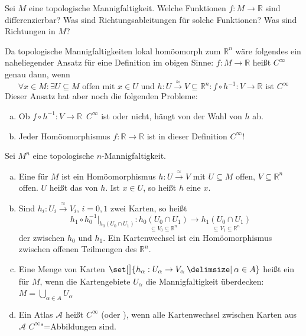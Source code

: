 Sei $M$ eine topologische Mannigfaltigkeit. 
Welche Funktionen $f \colon M \to \mathbb{R}$ sind differenzierbar? 
Was sind Richtungsableitungen für solche Funktionen? 
Was sind Richtungen in $M$?

Da topologische Mannigfaltigkeiten lokal homöomorph zum $\mathbb{R}^n $ wäre folgendes ein naheliegender Ansatz für eine Definition im obigen Sinne:
$f \colon M \to \mathbb{R}$ heißt $C^\infty$ genau dann, wenn
\[
	\forall x \in M : \exists  U \subseteq M \text{ offen mit } x \in U \text { und } h \colon U \xrightarrow{\approx}  V \subseteq \mathbb{R}^n : f \circ h ^{-1} : V \to \mathbb{R} \text{ ist } C^\infty
\]
Dieser Ansatz hat aber noch die folgenden Probleme:
\begin{enumerate}[a)]
	\item Ob $f \circ h ^{-1} \colon V \to \mathbb{R}$ $\, C^\infty$ ist oder nicht, hängt von der Wahl von $h$ ab.
	\item Jeder Homöomorphismus $f \colon \mathbb{R} \to \mathbb{R}$ ist in dieser Definition $C^\infty$!
\end{enumerate}

\begin{definition}[{name=[{Karten, Kartenwechsel, Atlanten}]}]
	Sei $M^n$ eine topologische $n$-Mannigfaltigkeit. 
	\begin{enumerate}[a)]
		\item Eine  für $M$ ist ein Homöomorphismus $h \colon U \xrightarrow{\approx}V$ mit $U \subseteq M$ offen, $V\subseteq\mathbb{R}^n$ offen. 
		$U$ heißt das  von $h$. 
		Ist $x \in U$, so heißt $h$ eine  $x$.
		\item Sind $h_i \colon U_i \xrightarrow{\approx} V_i$, $i=0,1$ zwei Karten, so heißt 
		\[
			h_1 \circ h_0 ^{-1}\big|_{h_0(U_0 \cap U_1)} \colon \underset{\subseteq V_0 \subseteq \mathbb{R}^n}{h_0(U_0 \cap U_1)} \to \underset{\subseteq V_1 \subseteq 
			\mathbb{R}^n}{h_1 (U_0 \cap U_1)}
		\]
		der  zwischen $h_0$ und $h_1$. 
		Ein Kartenwechsel ist ein Homöomorphismus zwischen offenen Teilmengen des $\mathbb{R}^n$. 
		\item Eine Menge von Karten $\set[\big]{h_\alpha : U_\alpha \to V_\alpha \given \alpha \in A}$ heißt ein  für $M$, wenn die Kartengebiete $U_\alpha$ die Mannigfaltigkeit überdecken:
		\(
			M = \bigcup_{\alpha \in A} U_\alpha
		\)
		\item Ein Atlas $\mathcal{A}$ heißt $C^\infty$ (oder ), wenn alle Kartenwechsel zwischen Karten aus $\mathcal{A}$ $C^\infty$"=Abbildungen sind.
	\end{enumerate}
\end{definition}

